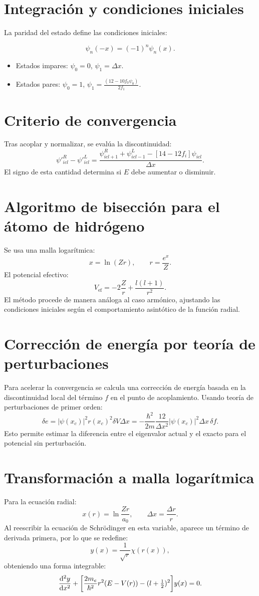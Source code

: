 \documentclass[11pt]{article}
\begin{document}
\section{Integración y condiciones iniciales}
La paridad del estado define las condiciones iniciales:

\[
\psi_n(-x)=(-1)^n\psi_n(x).
\]
\begin{itemize}
\item Estados impares: \(\psi_0=0\), \(\psi_1=\Delta x\).
\item Estados pares: \(\psi_0=1\),
\(\psi_1=\frac{(12-10f_0\psi_0)}{2f_1}\).
\end{itemize}

\section{Criterio de convergencia}
Tras acoplar y normalizar, se evalúa la discontinuidad:
\[
\psi'^{R}_{icl}-\psi'^{L}_{icl}
=\frac{\psi_{icl+1}^R+\psi_{icl-1}^L-[14-12f_i]\psi_{icl}}{\Delta x}.
\]
El signo de esta cantidad determina si \(E\) debe aumentar o disminuir.

\section{Algoritmo de bisección para el átomo de hidrógeno}
Se usa una malla logarítmica:
\[
x=\ln(Zr), \qquad r=\frac{e^x}{Z}.
\]
El potencial efectivo:
\[
V_{\text{ef}}=-2\frac{Z}{r}+\frac{l(l+1)}{r^2}.
\]
El método procede de manera análoga al caso armónico, ajustando las condiciones iniciales según el comportamiento asintótico de la función radial.

\section{Corrección de energía por teoría de perturbaciones}
Para acelerar la convergencia se calcula una corrección de energía basada en la discontinuidad local del término \(f\) en el punto de acoplamiento.  
Usando teoría de perturbaciones de primer orden:
\[
\delta e = |\psi(x_c)|^2 r(x_c)^2 \delta V \Delta x 
= - \frac{\hbar^2}{2m}\frac{12}{\Delta x^2}|\psi(x_c)|^2 \Delta x\,\delta f.
\]
Esto permite estimar la diferencia entre el eigenvalor actual y el exacto para el potencial sin perturbación.

\section{Transformación a malla logarítmica}
Para la ecuación radial:
\[
x(r)=\ln\frac{Zr}{a_0}, \qquad \Delta x=\frac{\Delta r}{r}.
\]
Al reescribir la ecuación de Schrödinger en esta variable, aparece un término de derivada primera, por lo que se redefine:
\[
y(x)=\frac{1}{\sqrt{r}}\chi(r(x)),
\]
obteniendo una forma integrable:
\[
\dv[2]{y}{x}+\qty[\frac{2m_e}{\hbar^2}r^2(E-V(r))-(l+\tfrac{1}{2})^2]y(x)=0.
\]
\end{document}
